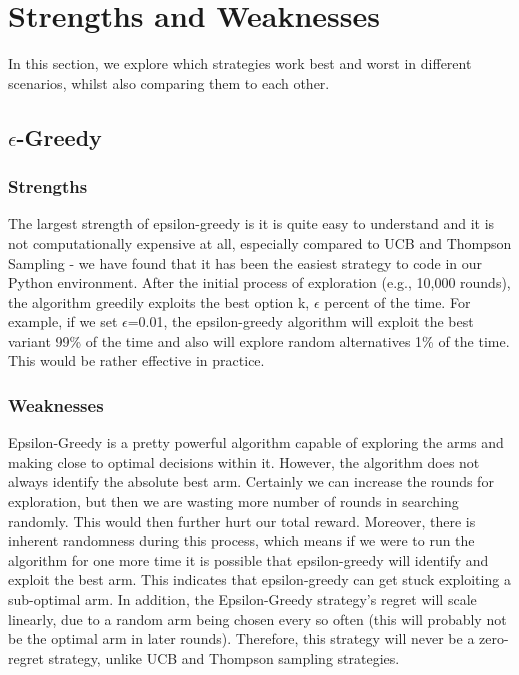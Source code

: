\section{Strengths and Weaknesses}\label{sec:strengths-and-weaknesses}
In this section, we explore which strategies work best and worst in different scenarios, whilst also comparing them to each other.

\subsection{$\epsilon$-Greedy}\label{subsec:$epsilon$-greedy}

\subsubsection{Strengths}
The largest strength of epsilon-greedy is it is quite easy to understand and it is not computationally expensive at all, especially compared to UCB and Thompson Sampling - we have found that it has been the easiest strategy to code in our Python environment.
After the initial process of exploration (e.g., 10,000 rounds), the algorithm greedily exploits the best option k, $\epsilon$ percent of the time.
For example, if we set $\epsilon$=0.01, the epsilon-greedy algorithm will exploit the best variant 99\% of the time and also will explore random alternatives 1\% of the time.
This would be rather effective in practice.\citep{ConorMc2018}

\subsubsection{Weaknesses}
Epsilon-Greedy is a pretty powerful algorithm capable of exploring the arms and making close to optimal decisions within it.
However, the algorithm does not always identify the absolute best arm.
Certainly we can increase the rounds for exploration, but then we are wasting more number of rounds in searching randomly.
This would then further hurt our total reward.
Moreover, there is inherent randomness during this process, which means if we were to run the algorithm for one more time it is possible that epsilon-greedy will identify and exploit the best arm.
This indicates that epsilon-greedy can get stuck exploiting a sub-optimal arm.\citep{ConorMc2018}
\newline
In addition, the Epsilon-Greedy strategy's regret will scale linearly, due to a random arm being chosen every so often (this will probably not be the optimal arm in later rounds).
Therefore, this strategy will never be a zero-regret strategy, unlike UCB and Thompson sampling strategies.


